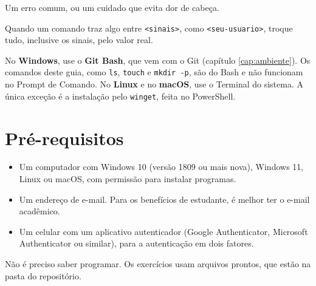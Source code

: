 \begin{aviso}
Um erro comum, ou um cuidado que evita dor de cabeça.
\end{aviso}

Quando um comando traz algo entre \texttt{<sinais>}, como
\texttt{<seu-usuario>}, troque tudo, inclusive os sinais, pelo valor real.

\begin{dica}
No \textbf{Windows}, use o \textbf{Git Bash}, que vem com o Git (capítulo
\ref{cap:ambiente}). Os comandos deste guia, como \texttt{ls}, \texttt{touch}
e \texttt{mkdir -p}, são do Bash e não funcionam no Prompt de Comando. No
\textbf{Linux} e no \textbf{macOS}, use o Terminal do sistema. A única exceção
é a instalação pelo \texttt{winget}, feita no PowerShell.
\end{dica}

\section{Pré-requisitos}

\begin{itemize}
  \item Um computador com Windows 10 (versão 1809 ou mais nova), Windows 11,
        Linux ou macOS, com permissão para instalar programas.
  \item Um endereço de e-mail. Para os benefícios de estudante, é melhor ter o
        e-mail acadêmico.
  \item Um celular com um aplicativo autenticador (Google Authenticator,
        Microsoft Authenticator ou similar), para a autenticação em dois
        fatores.
\end{itemize}

Não é preciso saber programar. Os exercícios usam arquivos prontos, que estão
na pasta  do repositório.
